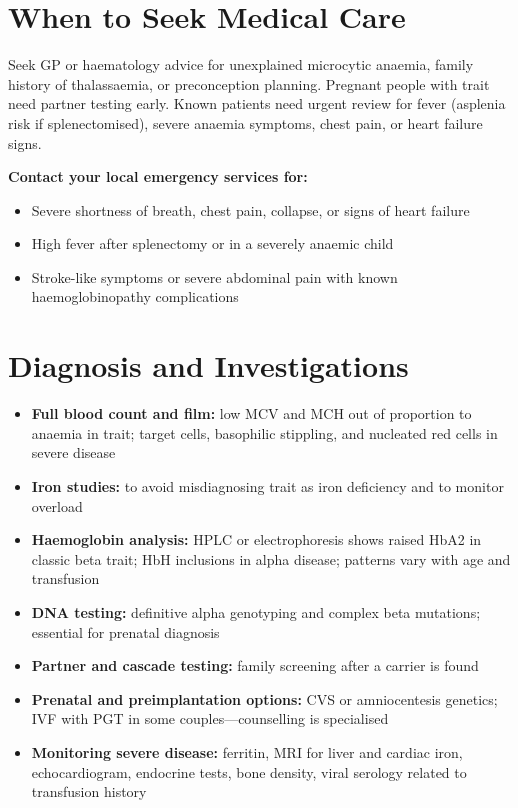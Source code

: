 \section*{When to Seek Medical Care}
Seek GP or haematology advice for unexplained microcytic anaemia, family history of thalassaemia, or preconception planning. Pregnant people with trait need partner testing early. Known patients need urgent review for fever (asplenia risk if splenectomised), severe anaemia symptoms, chest pain, or heart failure signs.

\textbf{Contact your local emergency services for:}
\begin{itemize}
    \item Severe shortness of breath, chest pain, collapse, or signs of heart failure
    \item High fever after splenectomy or in a severely anaemic child
    \item Stroke-like symptoms or severe abdominal pain with known haemoglobinopathy complications
\end{itemize}

\section*{Diagnosis and Investigations}
\begin{itemize}
    \item \textbf{Full blood count and film:} low MCV and MCH out of proportion to anaemia in trait; target cells, basophilic stippling, and nucleated red cells in severe disease
    \item \textbf{Iron studies:} to avoid misdiagnosing trait as iron deficiency and to monitor overload
    \item \textbf{Haemoglobin analysis:} HPLC or electrophoresis shows raised HbA2 in classic beta trait; HbH inclusions in alpha disease; patterns vary with age and transfusion
    \item \textbf{DNA testing:} definitive alpha genotyping and complex beta mutations; essential for prenatal diagnosis
    \item \textbf{Partner and cascade testing:} family screening after a carrier is found
    \item \textbf{Prenatal and preimplantation options:} CVS or amniocentesis genetics; IVF with PGT in some couples---counselling is specialised
    \item \textbf{Monitoring severe disease:} ferritin, MRI for liver and cardiac iron, echocardiogram, endocrine tests, bone density, viral serology related to transfusion history
\end{itemize}

